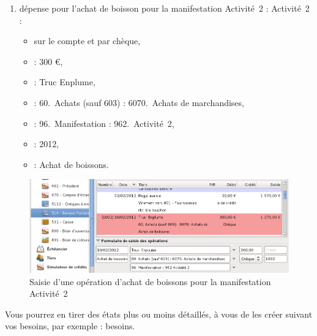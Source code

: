 \begin{enumerate}
\ifIllustration
\newpage
\fi

	\item dépense pour l'achat de boisson pour la manifestation \ifIllustration Activité~2 :
	\else Activité~2 :
	\fi
		\begin{itemize}
			\item sur le compte  et par chèque,
			\item {} : 300 €,					
			\item {} : Truc Enplume,
			\item {} : 60.~Achats (sauf 603) : 6070.~Achats de marchandises,
			\item {} : 96.~Manifestation : 962.~Activité~2,
			\item {} : 2012,
			\item {} : Achat de boissons.
		\end{itemize}
\end{enumerate}

\ifIllustration
\begin{figure}[hb]
\begin{center}
\includegraphics[scale=0.5]{image/screenshot/asso_drink_expense}
\end{center}
\caption{Saisie d'une opération d'achat de boissons pour la manifestation Activité~2}
\label{asso-drink-expense-img}
\end{figure}
\fi	

Vous pourrez en tirer des états plus ou moins détaillés, à vous de les créer suivant vos \ifIllustration besoins, par exemple :
	\else besoins.
	\fi
	
